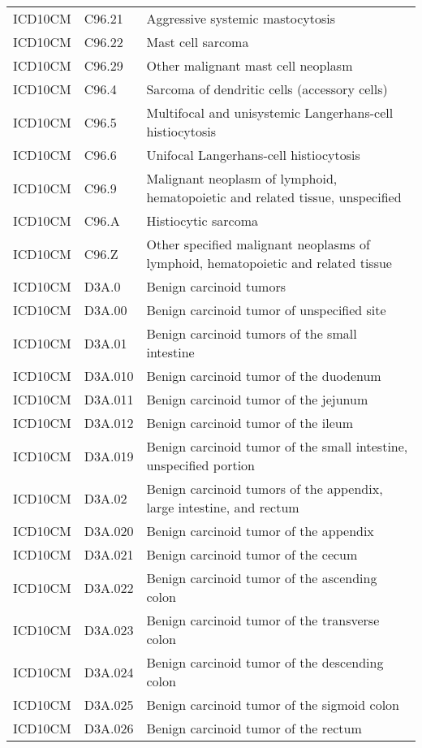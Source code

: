 \begin{table}[ht]
\begin{tabular}{lll}
  ICD10CM & C96.21 & Aggressive systemic mastocytosis \\ 
  ICD10CM & C96.22 & Mast cell sarcoma \\ 
  ICD10CM & C96.29 & Other malignant mast cell neoplasm \\ 
  ICD10CM & C96.4 & Sarcoma of dendritic cells (accessory cells) \\ 
  ICD10CM & C96.5 & Multifocal and unisystemic Langerhans-cell histiocytosis \\ 
  ICD10CM & C96.6 & Unifocal Langerhans-cell histiocytosis \\ 
  ICD10CM & C96.9 & Malignant neoplasm of lymphoid, hematopoietic and related tissue, unspecified \\ 
  ICD10CM & C96.A & Histiocytic sarcoma \\ 
  ICD10CM & C96.Z & Other specified malignant neoplasms of lymphoid, hematopoietic and related tissue \\ 
  ICD10CM & D3A.0 & Benign carcinoid tumors \\ 
  ICD10CM & D3A.00 & Benign carcinoid tumor of unspecified site \\ 
  ICD10CM & D3A.01 & Benign carcinoid tumors of the small intestine \\ 
  ICD10CM & D3A.010 & Benign carcinoid tumor of the duodenum \\ 
  ICD10CM & D3A.011 & Benign carcinoid tumor of the jejunum \\ 
  ICD10CM & D3A.012 & Benign carcinoid tumor of the ileum \\ 
  ICD10CM & D3A.019 & Benign carcinoid tumor of the small intestine, unspecified portion \\ 
  ICD10CM & D3A.02 & Benign carcinoid tumors of the appendix, large intestine, and rectum \\ 
  ICD10CM & D3A.020 & Benign carcinoid tumor of the appendix \\ 
  ICD10CM & D3A.021 & Benign carcinoid tumor of the cecum \\ 
  ICD10CM & D3A.022 & Benign carcinoid tumor of the ascending colon \\ 
  ICD10CM & D3A.023 & Benign carcinoid tumor of the transverse colon \\ 
  ICD10CM & D3A.024 & Benign carcinoid tumor of the descending colon \\ 
  ICD10CM & D3A.025 & Benign carcinoid tumor of the sigmoid colon \\ 
  ICD10CM & D3A.026 & Benign carcinoid tumor of the rectum \\ 

\end{tabular}
\end{table}
